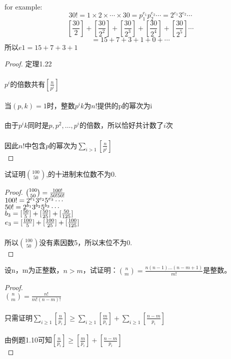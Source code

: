 \documentclass[cn,10pt]{elegantbook}
\begin{document}
for example:
 \[
  30!= 1 \times 2 \times \cdots \times 30 = p_1^{e_1}p_2^{e_2} \cdots = 2^{e_1}3^{e_2} \cdots 
 \]
 \[
  [\frac{30}{2}]+[\frac{30}{2^2}] +[\frac{30}{2^3}] +[\frac{30}{2^4}]+[\frac{30}{2^5}] \cdots 
 \]
 \[
   =15+7+3+1+0+ \cdots
 \]
所以$e1 = 15+7+3+1$
\begin{proof}
  定理1.22\\
  \\$p^i$的倍数共有$[\frac{n}{p^i}]$\\
  \\当$(p,k) = 1$时，整数$p^ik$为$n!$提供的p的幂次为i\\
  \\由于$p^ik$同时是$p,p^2,\dots ,p^i$的倍数，所以恰好共计数了$i$次\\
  \\因此$n!$中包含$p$的幂次为$\sum_{i>1}[\frac{n}{p^i}]$\\
\end{proof}
\begin{example}
  试证明$ \binom{100}{50} $,的十进制末位数不为0.
\end{example}
\begin{proof}
  $\\ \binom{100}{50} = \frac{100!}{50!50!}$\\
  $\\100! = 2^{e_1}3^{e_2}5^{e_3} \cdots$\\
  $\\50! =  2^{b_1}3^{b_2}5^{b_3} \cdots$\\
  $\\b_3 = [\frac{50}{5}]+[\frac{50}{25}]+[\frac{50}{125}] $\\
  $\\e_3 = [\frac{100}{5}]+[\frac{100}{25}]+[\frac{100}{125}]$\\
  \\所以$\binom{100}{50}$没有素因数5，所以末位不为0.\\
\end{proof}
\begin{example}
  设n，m为正整数，$n>m$，试证明：$\binom{n}{m} = \frac{n(n-1)\dots(n-m+1)}{m!}$是整数。
\end{example}
\begin{proof}
  \\ $\binom{n}{m} = \frac{n!}{m!(n-m)!}$\\
  \\ 只需证明$\sum_{i \geq 1}[\frac{n}{p_i}] \geq \sum_{i \geq 1}[\frac{m}{p_i}]+ \sum_{i \geq 1}[\frac{n-m}{p_i}]$\\
  \\由例题1.10可知$[\frac{n}{p_i}] \geq [\frac{m}{p_i}]+ [\frac{n-m}{p_i}]$\\
\end{proof}
\end{document}
